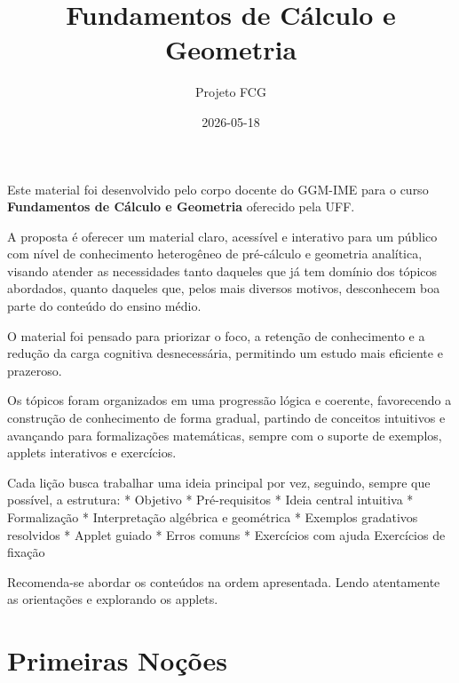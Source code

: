 \documentclass[
  brazilian,
  letterpaper,
  DIV=11,
  numbers=noendperiod]{scrreprt}
\title{Fundamentos de Cálculo e Geometria}
\author{Projeto FCG}
\date{2026-05-18}
\renewcommand*\contentsname{Índice}
\newcommand\contentsname{Índice}
\theoremstyle{definition}
\theoremstyle{plain}
\theoremstyle{definition}
\theoremstyle{remark}
\begin{document}
\maketitle

\renewcommand*\contentsname{Índice}
{
\setcounter{tocdepth}{2}
\tableofcontents
}


\chapter*{}\label{section}

\markboth{}{}

Este material foi desenvolvido pelo corpo docente do GGM-IME para o
curso \textbf{Fundamentos de Cálculo e Geometria} oferecido pela UFF.

A proposta é oferecer um material claro, acessível e interativo para um
público com nível de conhecimento heterogêneo de pré-cálculo e geometria
analítica, visando atender as necessidades tanto daqueles que já tem
domínio dos tópicos abordados, quanto daqueles que, pelos mais diversos
motivos, desconhecem boa parte do conteúdo do ensino médio.

O material foi pensado para priorizar o foco, a retenção de conhecimento
e a redução da carga cognitiva desnecessária, permitindo um estudo mais
eficiente e prazeroso.

Os tópicos foram organizados em uma progressão lógica e coerente,
favorecendo a construção de conhecimento de forma gradual, partindo de
conceitos intuitivos e avançando para formalizações matemáticas, sempre
com o suporte de exemplos, applets interativos e exercícios.

Cada lição busca trabalhar uma ideia principal por vez, seguindo, sempre
que possível, a estrutura: * Objetivo * Pré-requisitos * Ideia central
intuitiva * Formalização * Interpretação algébrica e geométrica *
Exemplos gradativos resolvidos * Applet guiado * Erros comuns *
Exercícios com ajuda Exercícios de fixação

Recomenda-se abordar os conteúdos na ordem apresentada. Lendo
atentamente as orientações e explorando os applets.


\chapter{Primeiras Noções}\label{primeiras-nouxe7uxf5es}
\end{document}
